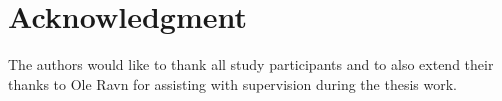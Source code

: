 \section*{Acknowledgment}

The authors would like to thank all study participants and to also extend their thanks to Ole Ravn for assisting with supervision during the thesis work.


% 
% 

% 
